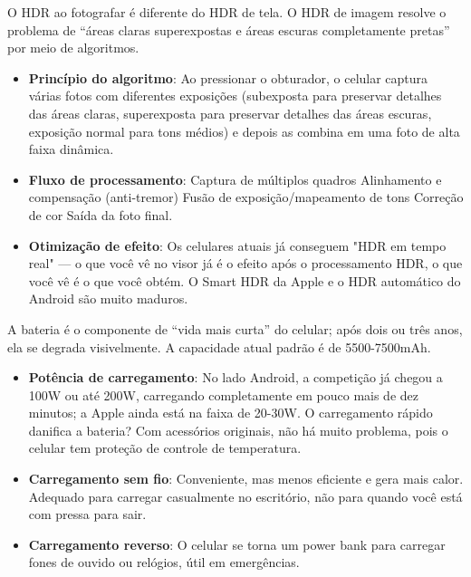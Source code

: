
O HDR ao fotografar é diferente do HDR de tela. O HDR de imagem resolve o problema de “áreas claras superexpostas e áreas escuras completamente pretas” por meio de algoritmos.

\begin{itemize}
  \item \textbf{Princípio do algoritmo}: Ao pressionar o obturador, o celular captura várias fotos com diferentes exposições (subexposta para preservar detalhes das áreas claras, superexposta para preservar detalhes das áreas escuras, exposição normal para tons médios) e depois as combina em uma foto de alta faixa dinâmica.
  \item \textbf{Fluxo de processamento}: Captura de múltiplos quadros Alinhamento e compensação (anti-tremor) Fusão de exposição/mapeamento de tons Correção de cor Saída da foto final.
  \item \textbf{Otimização de efeito}: Os celulares atuais já conseguem "HDR em tempo real" — o que você vê no visor já é o efeito após o processamento HDR, o que você vê é o que você obtém. O Smart HDR da Apple e o HDR automático do Android são muito maduros.
\end{itemize}


A bateria é o componente de “vida mais curta” do celular; após dois ou três anos, ela se degrada visivelmente. A capacidade atual padrão é de 5500-7500mAh.

\begin{itemize}
  \item \textbf{Potência de carregamento}: No lado Android, a competição já chegou a 100W ou até 200W, carregando completamente em pouco mais de dez minutos; a Apple ainda está na faixa de 20-30W. O carregamento rápido danifica a bateria? Com acessórios originais, não há muito problema, pois o celular tem proteção de controle de temperatura.
  \item \textbf{Carregamento sem fio}: Conveniente, mas menos eficiente e gera mais calor. Adequado para carregar casualmente no escritório, não para quando você está com pressa para sair.
  \item \textbf{Carregamento reverso}: O celular se torna um power bank para carregar fones de ouvido ou relógios, útil em emergências.
\end{itemize}


